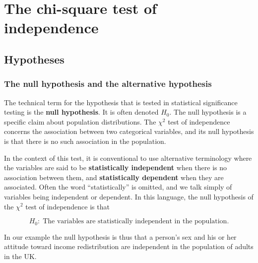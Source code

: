 \documentclass[11pt,a4paper,openany]{book}
\begin{document}
\section{The chi-square test of independence}\label{s-tables-chi2test}

\subsection{Hypotheses}\label{ss-tables-chi2test-null}

\subsubsection*{The null hypothesis and the alternative
hypothesis}\label{the-null-hypothesis-and-the-alternative-hypothesis}

The technical term for the hypothesis that is tested in statistical
significance testing is the \textbf{null hypothesis}. It is often
denoted \(H_{0}\). The null hypothesis is a specific claim about
population distributions. The \(\chi^{2}\) test of independence concerns
the association between two categorical variables, and its null
hypothesis is that there is no such association in the population.

In the context of this test, it is conventional to use alternative
terminology where the variables are said to be \textbf{statistically
independent} when there is no association between them, and
\textbf{statistically dependent} when they are associated. Often the
word ``statistically'' is omitted, and we talk simply of variables being
independent or dependent. In this language, the null hypothesis of the
\(\chi^{2}\) test of independence is that

\begin{equation}H_{0}: \;\text{The variables are statistically independent in the
population}.
\label{eq:H0-chi2}\end{equation}

In our example the null hypothesis is thus that a person's sex and his
or her attitude toward income redistribution are independent in the
population of adults in the UK.
\end{document}
